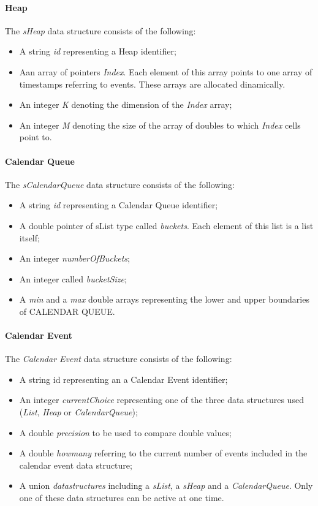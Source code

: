 \paragraph{Heap}

The \textit{sHeap} data structure consists of the following:
\begin{itemize}
\item	A string \textit{id} representing a Heap identifier;
\item	Aan array of pointers \textit{Index}. Each element of this array points to one array of timestamps referring to events. These arrays are allocated dinamically.
\item	An integer \textit{K} denoting the dimension of the \textit{Index} array;
\item 	An integer \textit{M} denoting the size of the array of doubles to which \textit{Index} cells point to.
\end{itemize}

\paragraph{Calendar Queue}
The \textit{sCalendarQueue} data structure consists of the following:
\begin{itemize}
\item	A string \textit{id} representing a Calendar Queue identifier;
\item	A double pointer of sList type called \textit{buckets}. Each element of this list is a list itself;
\item	An integer \textit{numberOfBuckets};
\item	An integer called \textit{bucketSize};
\item	A \textit{min }and a \textit{max} double arrays representing the lower and upper boundaries of CALENDAR QUEUE.
\end{itemize}

\paragraph{Calendar Event}
The \textit{Calendar Event}  data structure consists of the following:
\begin{itemize}	
\item A string id representing an a Calendar Event identifier;
\item	An integer \textit{currentChoice} representing one of the three data structures used (\textit{List}, \textit{Heap} or \textit{CalendarQueue});
\item	A double \textit{precision} to be used to compare double values;
\item A double \textit{howmany} referring to the current number of events included in the calendar event data structure;
\item	A union \textit{datastructures} including a \textit{sList}, a \textit{sHeap} and a \textit{CalendarQueue}. Only one of these data structures can be active at one time.
\end{itemize}	

